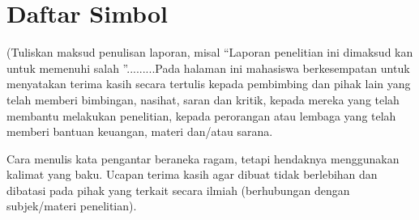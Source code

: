 \clearpage

\chapter*{Daftar Simbol}
\thispagestyle{fancy}
\fancyhf{}
\fancyhead[R]{\thepage}

\justifying
(Tuliskan maksud penulisan laporan, misal “Laporan penelitian ini dimaksud kan untuk memenuhi salah ”.........Pada halaman ini mahasiswa berkesempatan untuk menyatakan terima kasih secara tertulis kepada pembimbing dan pihak lain yang telah memberi bimbingan, nasihat, saran dan kritik, kepada mereka yang telah membantu melakukan penelitian, kepada perorangan atau lembaga yang telah memberi bantuan keuangan, materi dan/atau sarana.

Cara menulis kata pengantar beraneka ragam, tetapi hendaknya menggunakan kalimat yang baku. Ucapan terima kasih agar dibuat tidak berlebihan dan dibatasi pada pihak yang terkait secara ilmiah (berhubungan dengan subjek/materi penelitian). 
